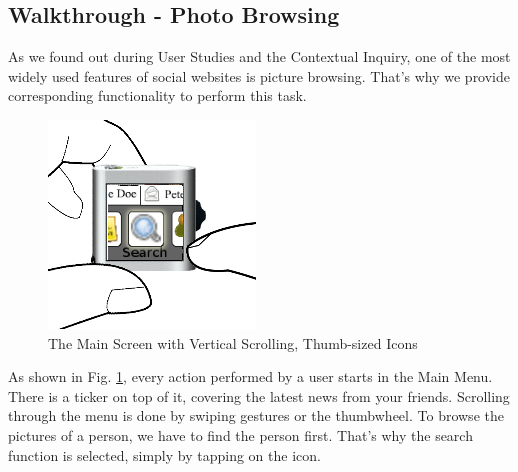 %
%
% 
%
\clearpage
\subsection{Walkthrough - Photo Browsing}
%
As we found out during User Studies and the Contextual Inquiry, one of the most widely used features of social websites is picture browsing.
That's why we provide corresponding functionality to perform this task.

\begin{figure}[h]
  \begin{center}
    \includegraphics[width=0.6\linewidth]{imgs/wt1.png}
  \end{center}
  \caption{The Main Screen with Vertical Scrolling, Thumb-sized Icons}
  \label{fig:wt1}
\end{figure}
%
As shown in Fig. \ref{fig:wt1}, every action performed by a user starts in the Main Menu. There is a ticker on top of it, covering the latest news from your friends. Scrolling through the menu is done by swiping gestures or the thumbwheel.
To browse the pictures of a person, we have to find the person first. That's why the search function is selected, simply by tapping on the icon.

